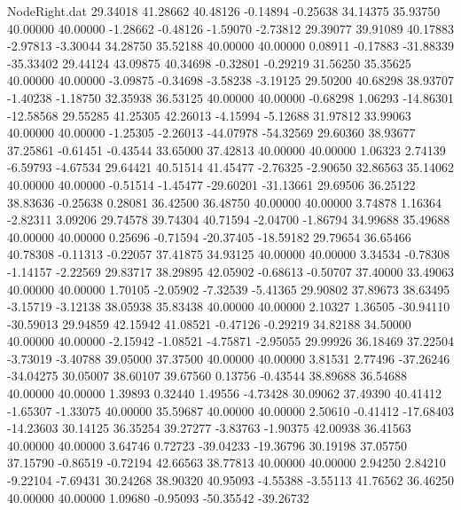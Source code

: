 \begin{filecontents}{NodeRight.dat}
  29.34018   41.28662   40.48126    -0.14894   -0.25638   34.14375   35.93750   40.00000   40.00000   -1.28662   -0.48126   -1.59070   -2.73812
  29.39077   39.91089   40.17883    -2.97813   -3.30044   34.28750   35.52188   40.00000   40.00000    0.08911   -0.17883  -31.88339  -35.33402
  29.44124   43.09875   40.34698    -0.32801   -0.29219   31.56250   35.35625   40.00000   40.00000   -3.09875   -0.34698   -3.58238   -3.19125
  29.50200   40.68298   38.93707    -1.40238   -1.18750   32.35938   36.53125   40.00000   40.00000   -0.68298    1.06293  -14.86301  -12.58568
  29.55285   41.25305   42.26013    -4.15994   -5.12688   31.97812   33.99063   40.00000   40.00000   -1.25305   -2.26013  -44.07978  -54.32569
  29.60360   38.93677   37.25861    -0.61451   -0.43544   33.65000   37.42813   40.00000   40.00000    1.06323    2.74139   -6.59793   -4.67534
  29.64421   40.51514   41.45477    -2.76325   -2.90650   32.86563   35.14062   40.00000   40.00000   -0.51514   -1.45477  -29.60201  -31.13661
  29.69506   36.25122   38.83636    -0.25638    0.28081   36.42500   36.48750   40.00000   40.00000    3.74878    1.16364   -2.82311    3.09206
  29.74578   39.74304   40.71594    -2.04700   -1.86794   34.99688   35.49688   40.00000   40.00000    0.25696   -0.71594  -20.37405  -18.59182
  29.79654   36.65466   40.78308    -0.11313   -0.22057   37.41875   34.93125   40.00000   40.00000    3.34534   -0.78308   -1.14157   -2.22569
  29.83717   38.29895   42.05902    -0.68613   -0.50707   37.40000   33.49063   40.00000   40.00000    1.70105   -2.05902   -7.32539   -5.41365
  29.90802   37.89673   38.63495    -3.15719   -3.12138   38.05938   35.83438   40.00000   40.00000    2.10327    1.36505  -30.94110  -30.59013
  29.94859   42.15942   41.08521    -0.47126   -0.29219   34.82188   34.50000   40.00000   40.00000   -2.15942   -1.08521   -4.75871   -2.95055
  29.99926   36.18469   37.22504    -3.73019   -3.40788   39.05000   37.37500   40.00000   40.00000    3.81531    2.77496  -37.26246  -34.04275
  30.05007   38.60107   39.67560     0.13756   -0.43544   38.89688   36.54688   40.00000   40.00000    1.39893    0.32440    1.49556   -4.73428
  30.09062   37.49390   40.41412    -1.65307   -1.33075   40.00000   35.59687   40.00000   40.00000    2.50610   -0.41412  -17.68403  -14.23603
  30.14125   36.35254   39.27277    -3.83763   -1.90375   42.00938   36.41563   40.00000   40.00000    3.64746    0.72723  -39.04233  -19.36796
  30.19198   37.05750   37.15790    -0.86519   -0.72194   42.66563   38.77813   40.00000   40.00000    2.94250    2.84210   -9.22104   -7.69431
  30.24268   38.90320   40.95093    -4.55388   -3.55113   41.76562   36.46250   40.00000   40.00000    1.09680   -0.95093  -50.35542  -39.26732

\end{filecontents}
